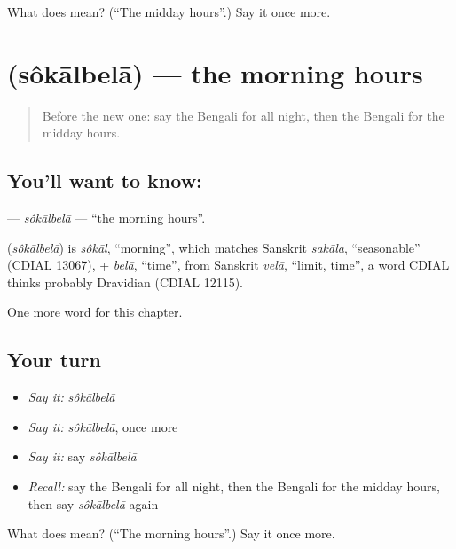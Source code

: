\begin{tcolorbox}[breakable,colback=teal!4,colframe=teal!35!black,title={Before you move on}]
What does  mean? (\textquotedblleft{}The midday hours\textquotedblright{}.) Say it once more.
\end{tcolorbox}
\section[\texorpdfstring{\bn{সকালবেলা} (sôkālbelā)}{সকালবেলা (sôkālbelā)}]{ (sôkālbelā) — the morning hours}

\label{lesson:BN-C95-sokalbela}



\begin{quote}
Before the new one: say the Bengali for all night, then the Bengali for the midday hours.
\end{quote}

\subsection*{You'll want to know: }
\textbf{} — \emph{sôkālbelā} — \textquotedblleft{}the morning hours\textquotedblright{}.

\begin{cousinweb}
\textbf{} (\emph{sôkālbelā}) is \emph{sôkāl}, \textquotedblleft{}morning\textquotedblright{}, which matches Sanskrit \emph{sakāla}, \textquotedblleft{}seasonable\textquotedblright{} (CDIAL 13067), + \emph{belā}, \textquotedblleft{}time\textquotedblright{}, from Sanskrit \emph{velā}, \textquotedblleft{}limit, time\textquotedblright{}, a word CDIAL thinks probably Dravidian (CDIAL 12115).
\end{cousinweb}

\begin{grammarlens}[title={What you've built}]
One more word for this chapter.
\end{grammarlens}

\subsection*{Your turn}
\begin{itemize}
\raggedright
  \item \emph{Say it:} \emph{sôkālbelā}
  \item \emph{Say it:} \emph{sôkālbelā}, once more
  \item \emph{Say it:} say \emph{sôkālbelā}
  \item \emph{Recall:} say the Bengali for all night, then the Bengali for the midday hours, then say \emph{sôkālbelā} again
\end{itemize}

\begin{tcolorbox}[breakable,colback=teal!4,colframe=teal!35!black,title={Before you move on}]
What does  mean? (\textquotedblleft{}The morning hours\textquotedblright{}.) Say it once more.
\end{tcolorbox}
